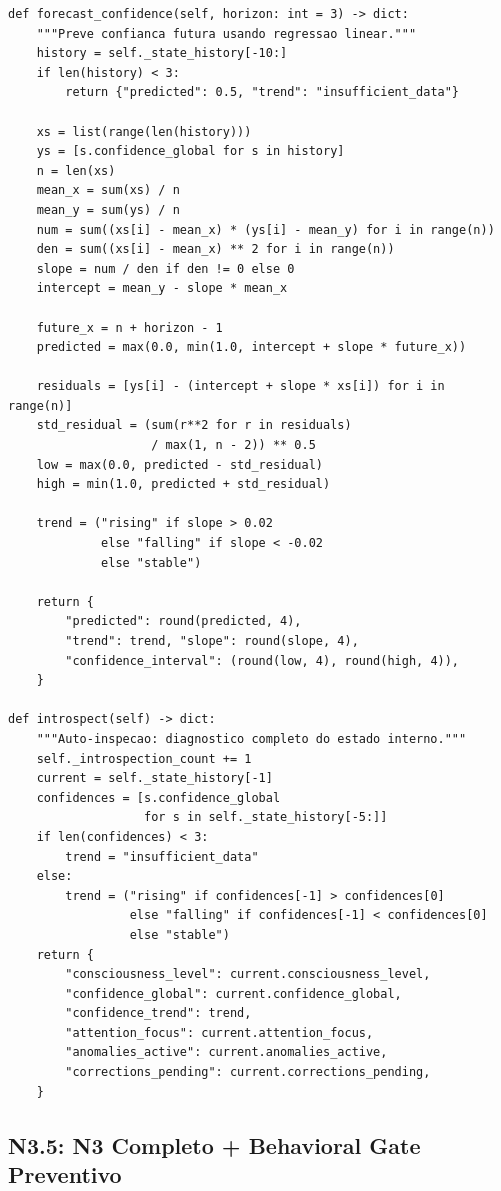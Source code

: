 \begin{lstlisting}[style=pythonstyle, caption={SelfModel: forecasting e introspeccao (self\_model.py:294-418)}]
def forecast_confidence(self, horizon: int = 3) -> dict:
    """Preve confianca futura usando regressao linear."""
    history = self._state_history[-10:]
    if len(history) < 3:
        return {"predicted": 0.5, "trend": "insufficient_data"}

    xs = list(range(len(history)))
    ys = [s.confidence_global for s in history]
    n = len(xs)
    mean_x = sum(xs) / n
    mean_y = sum(ys) / n
    num = sum((xs[i] - mean_x) * (ys[i] - mean_y) for i in range(n))
    den = sum((xs[i] - mean_x) ** 2 for i in range(n))
    slope = num / den if den != 0 else 0
    intercept = mean_y - slope * mean_x

    future_x = n + horizon - 1
    predicted = max(0.0, min(1.0, intercept + slope * future_x))

    residuals = [ys[i] - (intercept + slope * xs[i]) for i in range(n)]
    std_residual = (sum(r**2 for r in residuals)
                    / max(1, n - 2)) ** 0.5
    low = max(0.0, predicted - std_residual)
    high = min(1.0, predicted + std_residual)

    trend = ("rising" if slope > 0.02
             else "falling" if slope < -0.02
             else "stable")

    return {
        "predicted": round(predicted, 4),
        "trend": trend, "slope": round(slope, 4),
        "confidence_interval": (round(low, 4), round(high, 4)),
    }

def introspect(self) -> dict:
    """Auto-inspecao: diagnostico completo do estado interno."""
    self._introspection_count += 1
    current = self._state_history[-1]
    confidences = [s.confidence_global
                   for s in self._state_history[-5:]]
    if len(confidences) < 3:
        trend = "insufficient_data"
    else:
        trend = ("rising" if confidences[-1] > confidences[0]
                 else "falling" if confidences[-1] < confidences[0]
                 else "stable")
    return {
        "consciousness_level": current.consciousness_level,
        "confidence_global": current.confidence_global,
        "confidence_trend": trend,
        "attention_focus": current.attention_focus,
        "anomalies_active": current.anomalies_active,
        "corrections_pending": current.corrections_pending,
    }
\end{lstlisting}

\subsection{N3.5: N3 Completo + Behavioral Gate Preventivo}


